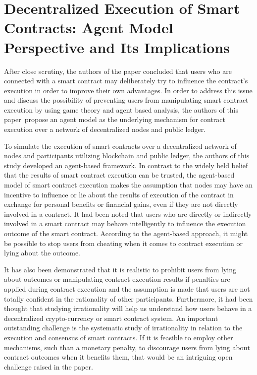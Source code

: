 \section{Decentralized Execution of Smart Contracts: Agent Model Perspective and Its Implications}

After close scrutiny, the authors of the paper \cite{decentralized} concluded that users who are connected with a smart contract may deliberately try to influence the contract's execution in order to improve their own advantages. In order to address this issue and discuss the possibility of preventing users from manipulating smart contract execution by using game theory and agent based analysis, the authors of this paper propose an agent model as the underlying mechanism for contract execution over a network of decentralized nodes and public ledger.

\vspace{.5cm}

To simulate the execution of smart contracts over a decentralized network of nodes and participants utilizing blockchain and public ledger, the authors of this study developed an agent-based framework. In contrast to the widely held belief that the results of smart contract execution can be trusted, the agent-based model of smart contract execution makes the assumption that nodes may have an incentive to influence or lie about the results of execution of the contract in exchange for personal benefits or financial gains, even if they are not directly involved in a contract. It had been noted that users who are directly or indirectly involved in a smart contract may behave intelligently to influence the execution outcome of the smart contract. According to the agent-based approach, it might be possible to stop users from cheating when it comes to contract execution or lying about the outcome.

\vspace{.5cm}

It has also been demonstrated that it is realistic to prohibit users from lying about outcomes or manipulating contract execution results if penalties are applied during contract execution and the assumption is made that users are not totally confident in the rationality of other participants. Furthermore, it had been thought that studying irrationality will help us understand how users behave in a decentralized crypto-currency or smart contract system. An important outstanding challenge is the systematic study of irrationality in relation to the execution and consensus of smart contracts. If it is feasible to employ other mechanisms, such than a monetary penalty, to discourage users from lying about contract outcomes when it benefits them, that would be an intriguing open challenge raised in the paper.

